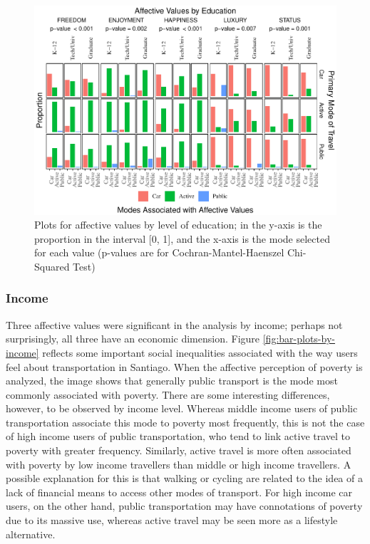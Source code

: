 \documentclass[]{elsarticle} %
\makeatletter
\def\maxwidth{\ifdim\Gin@nat@width>\linewidth\linewidth
\else\Gin@nat@width\fi}
\let\Oldincludegraphics\includegraphics
\renewcommand{\includegraphics}[1]{\Oldincludegraphics[width=\maxwidth]{#1}}
\makeatother
\begin{document}
\begin{figure}
\centering
\includegraphics{Dissonance_Santiago_v2_files/figure-latex/figure-bar-plots-by-attribute-and-education-1.pdf}
\caption{\label{fig:bar-plots-by-education}Plots for affective values by
level of education; in the y-axis is the proportion in the interval
{[}0, 1{]}, and the x-axis is the mode selected for each value (p-values
are for Cochran-Mantel-Haenszel Chi-Squared Test)}
\end{figure}

\hypertarget{income-1}{%
\subsubsection{Income}\label{income-1}}

Three affective values were significant in the analysis by income;
perhaps not surprisingly, all three have an economic dimension. Figure
\ref{fig:bar-plots-by-income} reflects some important social
inequalities associated with the way users feel about transportation in
Santiago. When the affective perception of poverty is analyzed, the
image shows that generally public transport is the mode most commonly
associated with poverty. There are some interesting differences,
however, to be observed by income level. Whereas middle income users of
public transportation associate this mode to poverty most frequently,
this is not the case of high income users of public transportation, who
tend to link active travel to poverty with greater frequency. Similarly,
active travel is more often associated with poverty by low income
travellers than middle or high income travellers. A possible explanation
for this is that walking or cycling are related to the idea of a lack of
financial means to access other modes of transport. For high income car
users, on the other hand, public transportation may have connotations of
poverty due to its massive use, whereas active travel may be seen more
as a lifestyle alternative.
\end{document}
